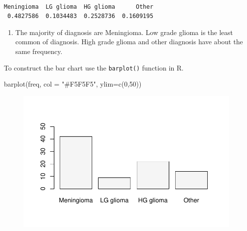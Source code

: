 \documentclass[
  letterpaper,
  DIV=11,
  numbers=noendperiod]{scrreprt}
\newenvironment{Shaded}{\begin{snugshade}}{\end{snugshade}}
\newcommand{\AttributeTok}[1]{\textcolor[rgb]{0.40,0.45,0.13}{#1}}
\newcommand{\DecValTok}[1]{\textcolor[rgb]{0.68,0.00,0.00}{#1}}
\newcommand{\FunctionTok}[1]{\textcolor[rgb]{0.28,0.35,0.67}{#1}}
\newcommand{\NormalTok}[1]{\textcolor[rgb]{0.00,0.23,0.31}{#1}}
\newcommand{\OtherTok}[1]{\textcolor[rgb]{0.00,0.23,0.31}{#1}}
\newcommand{\SpecialCharTok}[1]{\textcolor[rgb]{0.37,0.37,0.37}{#1}}
\newcommand{\StringTok}[1]{\textcolor[rgb]{0.13,0.47,0.30}{#1}}
\providecommand{\tightlist}{%
  \setlength{\itemsep}{0pt}\setlength{\parskip}{0pt}}\usepackage{longtable,booktabs,array}
\begin{document}
\begin{Shaded}
\end{Shaded}

\begin{verbatim}

Meningioma  LG glioma  HG glioma      Other 
 0.4827586  0.1034483  0.2528736  0.1609195 
\end{verbatim}

\begin{enumerate}
\def\labelenumi{\arabic{enumi}.}
\setcounter{enumi}{1}
\tightlist
\item
  The majority of diagnosis are Meningioma. Low grade glioma is the
  least common of diagnosis. High grade glioma and other diagnosis have
  about the same frequency.
\end{enumerate}

To construct the bar chart use the \texttt{barplot()} function in R.

\begin{Shaded}
\begin{Highlighting}[numbers=left,,]
\FunctionTok{barplot}\NormalTok{(freq, }\AttributeTok{col =} \StringTok{"\#F5F5F5"}\NormalTok{, }\AttributeTok{ylim=}\FunctionTok{c}\NormalTok{(}\DecValTok{0}\NormalTok{,}\DecValTok{50}\NormalTok{))}
\end{Highlighting}
\end{Shaded}

\begin{figure}[H]

{\centering \includegraphics{./03-DescriptiveII_files/figure-pdf/unnamed-chunk-3-1.pdf}

}

\end{figure}
\end{document}

